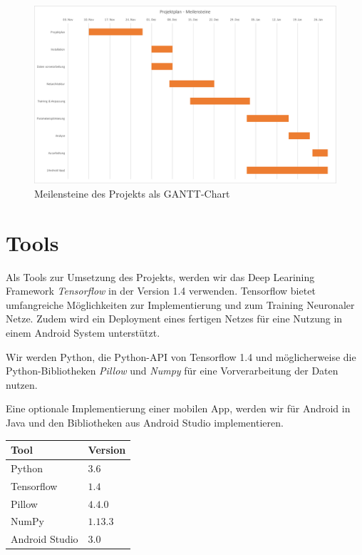 \documentclass[%
   10pt,              %
   a4paper,           %
   DIV10,             %
]{scrartcl}%
\begin{document}
 \begin{figure}[ht]
	\centering
 \includegraphics[width=\textwidth]{fig/gantt_projektplan}
 \caption{Meilensteine des Projekts als GANTT-Chart}
	\label{fig_gantt}
 \end{figure}

\newpage
\section*{Tools}
Als Tools zur Umsetzung des Projekts, werden wir das Deep Learining Framework \textit{Tensorflow} \cite{tensorflow2015-whitepaper} in der Version 1.4 verwenden. Tensorflow bietet umfangreiche Möglichkeiten zur Implementierung und zum Training Neuronaler Netze. Zudem wird ein Deployment eines fertigen Netzes für eine Nutzung in einem Android System unterstützt.

Wir werden Python, die Python-API von Tensorflow 1.4 und möglicherweise die Python-Bibliotheken \textit{Pillow} und \textit{Numpy} \cite{numpy} für eine Vorverarbeitung der Daten nutzen.

Eine optionale Implementierung einer mobilen App, werden wir für Android in Java und den Bibliotheken aus Android Studio \cite{androidstudio} implementieren. 

\begin{center}
	
\begin{tabular}{ll}
	\toprule
	Tool & Version \\
	\midrule
	Python & $3.6$  \\
	Tensorflow  & $1.4$   \\
	Pillow  & $4.4.0$    \\
	NumPy  & $1.13.3$    \\
	Android Studio  & $3.0$    \\
	\bottomrule
\end{tabular}

\end{center}
\end{document}
